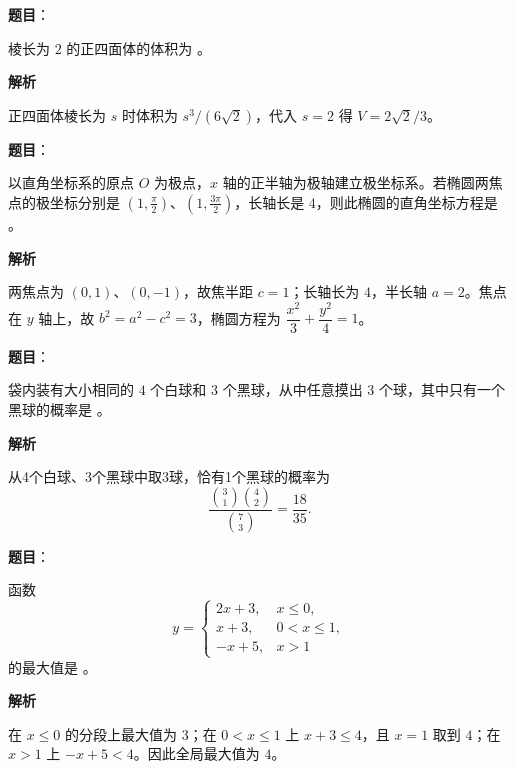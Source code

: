 \begin{answer}

\textbf{题目}：

棱长为 $2$ 的正四面体的体积为 \gkblank{}。

\textbf{解析}

正四面体棱长为 $s$ 时体积为 $s^3/(6\sqrt2)$，代入 $s=2$ 得 $V=2\sqrt2/3$。


\end{answer}
\begin{answer}

\textbf{题目}：

以直角坐标系的原点 $O$ 为极点，$x$ 轴的正半轴为极轴建立极坐标系。若椭圆两焦点的极坐标分别是 $(1,\frac\pi2)$、$(1,\frac{3\pi}2)$，长轴长是 $4$，则此椭圆的直角坐标方程是 \gkblank{}。

\textbf{解析}

两焦点为 $(0,1)$、$(0,-1)$，故焦半距 $c=1$；长轴长为 $4$，半长轴 $a=2$。焦点在 $y$ 轴上，故 $b^2=a^2-c^2=3$，椭圆方程为 $\dfrac{x^2}{3}+\dfrac{y^2}{4}=1$。


\end{answer}
\begin{answer}

\textbf{题目}：

袋内装有大小相同的 $4$ 个白球和 $3$ 个黑球，从中任意摸出 $3$ 个球，其中只有一个黑球的概率是 \gkblank{}。

\textbf{解析}

从4个白球、3个黑球中取3球，恰有1个黑球的概率为
\nopagebreak[4]
\[
\frac{\binom31\binom42}{\binom73}=\frac{18}{35}.
\]


\end{answer}
\begin{answer}

\textbf{题目}：

函数
\nopagebreak[4]
\[
y=\begin{cases}
2x+3,&x\le 0,\\
x+3,&0<x\le 1,\\
-x+5,&x>1
\end{cases}
\]
的最大值是 \gkblank{}。

\textbf{解析}

在 $x\le0$ 的分段上最大值为 $3$；在 $0<x\le1$ 上 $x+3\le4$，且 $x=1$ 取到 $4$；在 $x>1$ 上 $-x+5<4$。因此全局最大值为 $4$。


\end{answer}
